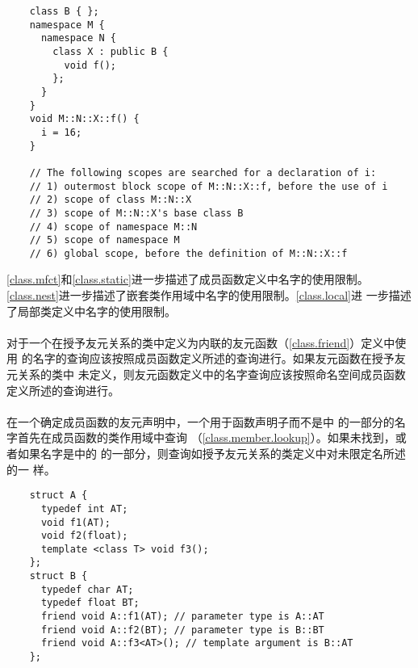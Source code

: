 \begin{example}
  \begin{lstlisting}
    class B { };
    namespace M {
      namespace N {
        class X : public B {
          void f();
        };
      }
    }
    void M::N::X::f() {
      i = 16;
    }

    // The following scopes are searched for a declaration of i:
    // 1) outermost block scope of M::N::X::f, before the use of i
    // 2) scope of class M::N::X
    // 3) scope of M::N::X's base class B
    // 4) scope of namespace M::N
    // 5) scope of namespace M
    // 6) global scope, before the definition of M::N::X::f
  \end{lstlisting}
\end{example}

\begin{note}
  \ref{class.mfct}和\ref{class.static}进一步描述了成员函数定义中名字的使用限制。
  \ref{class.nest}进一步描述了嵌套类作用域中名字的使用限制。\ref{class.local}进
  一步描述了局部类定义中名字的使用限制。
\end{note}

\paragraph{} %
对于一个在授予友元关系的类中定义为内联的友元函数（\ref{class.friend}）定义中使用
的名字的查询应该按照成员函数定义所述的查询进行。如果友元函数在授予友元关系的类中
未定义，则友元函数定义中的名字查询应该按照命名空间成员函数定义所述的查询进行。

\paragraph{} %
\setlength{\parindent}{0pt}
在一个确定成员函数的友元声明中，一个用于函数声明子而不是中
的一部分的名字首先在成员函数的类作用域中查询
（\ref{class.member.lookup}）。如果未找到，或者如果名字是中的
的一部分，则查询如授予友元关系的类定义中对未限定名所述的一
样。

\begin{example}
  \begin{lstlisting}
    struct A {
      typedef int AT;
      void f1(AT);
      void f2(float);
      template <class T> void f3();
    };
    struct B {
      typedef char AT;
      typedef float BT;
      friend void A::f1(AT); // parameter type is A::AT
      friend void A::f2(BT); // parameter type is B::BT
      friend void A::f3<AT>(); // template argument is B::AT
    };
  \end{lstlisting}
\end{example}

